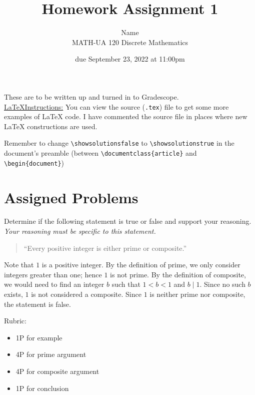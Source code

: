 \documentclass{article}
\title{Homework Assignment 1}
\author{%
    Name
\\  MATH-UA 120 Discrete Mathematics
}
\date{due September 23, 2022 at 11:00pm}
\newif\ifshowsolutions
\newcommand{\danger}{\marginpar[\hfill\dbend]{\dbend\hfill}}
\theoremstyle{definition}
\begin{document}
\maketitle



These are to be written up and turned in to Gradescope.\\



\ifshowsolutions
    \SetupExSheets{solution/print=true}
\else
    \danger
 \underline{ \LaTeX  Instructions:}  You can view the source (\texttt{.tex}) file to get some more examples of \LaTeX{} code.  I have commented the source file in places where new \LaTeX{} constructions are used.
  
  Remember to change \verb|\showsolutionsfalse| to \verb|\showsolutionstrue|
    in the document's preamble 
    (between \verb|\documentclass{article}| and \verb|\begin{document}|)
\fi

\section*{Assigned Problems}

\begin{question}
Determine if the following statement is true or false and support your reasoning. \emph{Your reasoning must be specific to this statement.}
\begin{quote}
``Every positive integer is either prime or composite.''
\end{quote}
\end{question}
\begin{solution}
Note that $1$ is a positive integer. By the definition of prime, we only consider integers greater than one; hence $1$ is not prime. By the definition of composite, we would need to find an integer $b$ such that $1<b<1$ and $b\mid 1$. Since no such $b$ exists, $1$ is not considered a composite. Since $1$ is neither prime nor composite, the statement is false.

{\color{red} Rubric:
\begin{itemize}
\item 1P for example
\item 4P for prime argument
\item 4P for composite argument
\item 1P for conclusion
\end{itemize}}
\end{solution}
\end{document}
